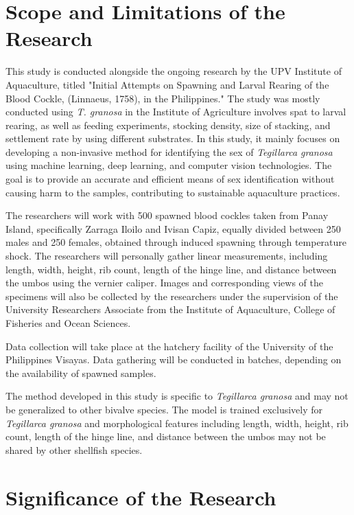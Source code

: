 \section{Scope and Limitations of the Research}
\label{sec:scopelimitations}

This study is conducted alongside the ongoing research by the UPV Institute of Aquaculture, titled "Initial Attempts on Spawning and Larval Rearing of the Blood Cockle, \Tegillarcagranosa (Linnaeus, 1758), in the Philippines." The study was mostly conducted using \textit{T. granosa} in the Institute of Agriculture involves spat to larval rearing, as well as feeding experiments, stocking density, size of stacking, and settlement rate by using different substrates. In this study, it mainly focuses on developing a non-invasive method for identifying the sex of \textit{Tegillarca granosa} using machine learning, deep learning, and computer vision technologies. The goal is to provide an accurate and efficient means of sex identification without causing harm to the samples, contributing to sustainable aquaculture practices.

The researchers will work with 500 spawned blood cockles taken from Panay Island, specifically Zarraga Iloilo and Ivisan Capiz, equally divided between 250 males and 250 females, obtained through induced spawning through temperature shock. The researchers will personally gather linear measurements, including length, width, height, rib count, length of the hinge line, and distance between the umbos using the vernier caliper. Images and corresponding views of the specimens will also be collected by the researchers under the supervision of the University Researchers Associate from the Institute of Aquaculture, College of Fisheries and Ocean Sciences.

Data collection will take place at the hatchery facility of the University of the Philippines Visayas. Data gathering will be conducted in batches, depending on the availability of spawned samples.

The method developed in this study is specific to \textit{Tegillarca granosa} and may not be generalized to other bivalve species. The model is trained exclusively for \textit{Tegillarca granosa} and morphological features including length, width, height, rib count, length of the hinge line, and distance between the umbos may not be shared by other shellfish species. 

\section{Significance of the Research}
\label{sec:significance}

